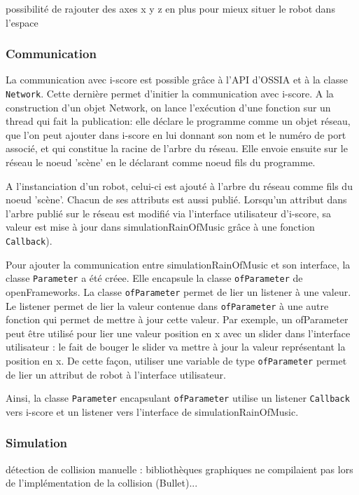 possibilité de rajouter des axes x y z en plus pour mieux situer le robot dans l'espace

\subsubsection{Communication}

La communication avec i-score est possible grâce à l'API d'OSSIA et à la classe \verb|Network|. Cette dernière permet d'initier la communication avec i-score. A la construction d'un objet Network, on lance l'exécution d'une fonction sur un thread qui fait la publication: elle déclare le programme comme un objet réseau, que l'on peut ajouter dans i-score en lui donnant son nom et le numéro de port associé, et qui constitue la racine de l'arbre du réseau. Elle envoie ensuite sur le réseau le noeud 'scène' en le déclarant comme noeud fils du programme.

A l'instanciation d'un robot, celui-ci est ajouté à l'arbre du réseau comme fils du noeud 'scène'. Chacun de ses attributs est aussi publié. Lorsqu'un attribut dans l'arbre publié sur le réseau est modifié via l'interface utilisateur d'i-score, sa valeur est mise à jour dans simulationRainOfMusic grâce à une fonction \verb|Callback|).

Pour ajouter la communication entre simulationRainOfMusic et son interface, la classe \verb|Parameter| a été créee. Elle encapsule la classe \verb|ofParameter| de openFrameworks. La classe \verb|ofParameter| permet de lier un listener à une valeur. Le listener permet de lier la valeur contenue dans \verb|ofParameter| à une autre fonction qui permet de mettre à jour cette valeur. Par exemple, un ofParameter peut être utilisé pour lier une valeur position en x avec un slider dans l'interface utilisateur : le fait de bouger le slider va mettre à jour la valeur représentant la position en x. De cette façon, utiliser une variable de type \verb|ofParameter| permet de lier un attribut de robot à l'interface utilisateur. 

Ainsi, la classe \verb|Parameter| encapsulant \verb|ofParameter| utilise un listener \verb|Callback| vers i-score et un listener vers l'interface de simulationRainOfMusic.

\subsubsection{Simulation}

détection de collision manuelle : bibliothèques graphiques ne compilaient pas lors de l'implémentation de la collision (Bullet)...


